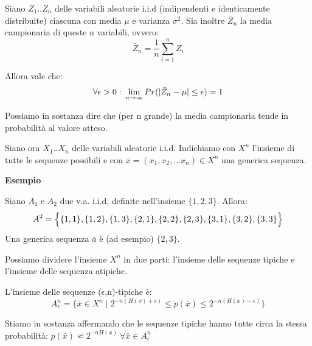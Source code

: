 Siano $Z_1..Z_n$ delle variabili aleatorie i.i.d (indipendenti e identicamente distribuite) ciascuna con media $\mu$ e varianza $\sigma^2$.
Sia inoltre $\bar{Z}_n$ la media campionaria di queste n variabili, ovvero:
\[
 \bar{Z}_n=\frac{1}{n} \sum_{i=1}^n Z_i
\]

Allora vale che:
\[
 \forall \epsilon > 0: \\
 \lim_{n\to\infty}Pr(|\bar{Z}_n-\mu|\le \epsilon)=1
\]

Possiamo in sostanza dire che (per n grande) la media campionaria tende in probabilità al valore atteso.

Siano ora $X_1..X_n$ delle variabili aleatorie i.i.d. Indichiamo con $X^n$ l'insieme di tutte le sequenze possibili e con $\bar{x}=(x_1,x_2,...x_n) \in X^n $ una generica sequenza.

\bigskip
\noindent
\textbf{Esempio}

\noindent
Siano $A_1$ e $A_2$ due v.a. i.i.d, definite nell'insieme $\{1,2,3\}$.
Allora:
\[
 A^2=\Bigl \lbrace \{1,1\},\{1,2\},\{1,3\},\{2,1\},\{2,2\},\{2,3\},\{3,1\},\{3,2\},\{3,3\} \Bigl \rbrace
\]
Una generica sequenza $\bar{a}$ è (ad esempio) $\{2,3\}$.

\bigskip
Possiamo dividere l'insieme $X^n$ in due parti: l'insieme delle sequenze tipiche e l'insieme delle sequenza atipiche.

\begin{definizione}
 L'insieme delle sequenze ($\epsilon$,n)-tipiche è:
\[
 A_{\epsilon}^n=\{ \bar{x} \in X^n \mid 2^{-n(H(x)+\epsilon)} \le p(\bar{x}) \le 2^{-n(H(x)-\epsilon)} \}
\]
\label{tipiche}
\end{definizione}

\noindent
Stiamo in sostanza affermando che le sequenze tipiche hanno tutte circa la stessa probabilità: 
$p(\bar{x}) \backsimeq 2^{-nH(x)} \ \forall \bar{x} \in A_{\epsilon}^n$

